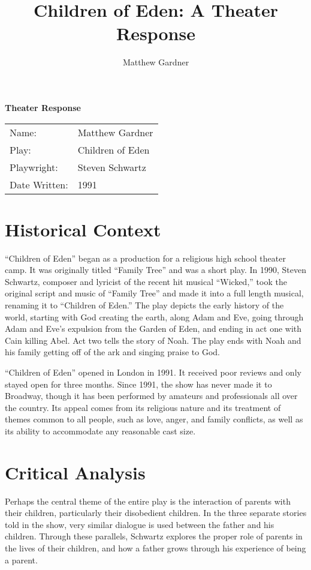 \documentclass[onecolumn, 12pt]{article}
\title{Children of Eden: A Theater Response}
\author{Matthew Gardner}
\date{}
\begin{document}
\textbf{Theater Response}

\begin{tabular}{ll}
  Name:&Matthew Gardner \\
  Play:&Children of Eden \\
  Playwright:&Steven Schwartz \\
  Date Written:&1991 \\
\end{tabular}

\section*{Historical Context}

``Children of Eden'' began as a production for a religious high school theater
camp.  It was originally titled ``Family Tree'' and was a short play.  In 1990,
Steven Schwartz, composer and lyricist of the recent hit musical ``Wicked,''
took the original script and music of ``Family Tree'' and made it into a full
length musical, renaming it to ``Children of Eden.''  The play depicts the
early history of the world, starting with God creating the earth, along Adam
and Eve, going through Adam and Eve's expulsion from the Garden of Eden, and
ending in act one with Cain killing Abel.  Act two tells the story of Noah.
The play ends with Noah and his family getting off of the ark and singing
praise to God.

``Children of Eden'' opened in London in 1991.  It received poor reviews and
only stayed open for three months.  Since 1991, the show has never made it to
Broadway, though it has been performed by amateurs and professionals all over
the country.  Its appeal comes from its religious nature and its treatment of
themes common to all people, such as love, anger, and family conflicts, as well
as its ability to accommodate any reasonable cast size.

\section*{Critical Analysis}

Perhaps the central theme of the entire play is the interaction of parents with
their children, particularly their disobedient children.  In the three separate
stories told in the show, very similar dialogue is used between the father and
his children.  Through these parallels, Schwartz explores the proper role of
parents in the lives of their children, and how a father grows through his
experience of being a parent.
\end{document}
